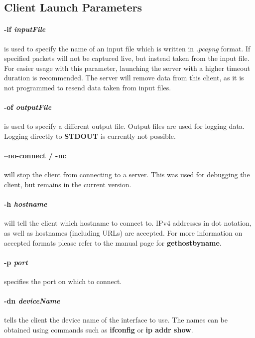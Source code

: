 \subsection*{Client Launch Parameters}
\paragraph{-if \textit{inputFile}} is  used to specify the name of an input file which is written in \textit{.pcapng} format.
If specified packets will not be captured live, but instead taken from the input file.
For easier usage with this parameter, launching the server with a higher timeout duration is recommended.
The server will remove data from this client, as it is not programmed to resend data taken from input files.

\paragraph{-of \textit{outputFile}} is used to specify a different output file.
Output files are used for logging data.
Logging directly to \textbf{STDOUT} is currently not possible.

\paragraph{--no-connect / -nc} will stop the client from connecting to a server.
This was used for debugging the client, but remains in the current version.

\paragraph{-h \textit{hostname}} will tell the client which hostname to connect to.
IPv4 addresses in dot notation, as well as hostnames (including URLs) are accepted.
For more information on accepted formats please refer to the manual page for \textbf{gethostbyname}.

\paragraph{-p \textit{port}} specifies the port on which to connect.

\paragraph{-dn \textit{deviceName}} tells the client the device name of the interface to use.
The names can be obtained using commands such as \textbf{ifconfig} or \textbf{ip addr show}.

